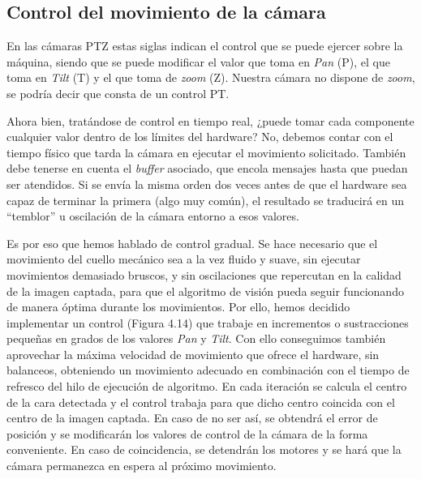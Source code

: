 \subsection{Control del movimiento de la cámara}
En las cámaras PTZ estas siglas indican el control que se puede ejercer sobre la máquina, siendo que se puede modificar el valor que toma en \textit{Pan} (P), el que toma en \textit{Tilt} (T) y el que toma de \textit{zoom} (Z). Nuestra cámara no dispone de \textit{zoom}, se podría decir que consta de un control PT.

Ahora bien, tratándose de control en tiempo real, ¿puede tomar cada componente cualquier valor dentro de los límites del hardware? No, debemos contar con el tiempo físico que tarda la cámara en ejecutar el movimiento solicitado. También debe tenerse en cuenta el \textit{buffer} asociado, que encola mensajes hasta que puedan ser atendidos. Si se envía la misma orden dos veces antes de que el hardware sea capaz de terminar la primera (algo muy común), el resultado se traducirá en un “temblor” u oscilación de la cámara entorno a esos valores.

Es por eso que hemos hablado de control gradual. Se hace necesario que el movimiento del cuello mecánico sea a la vez fluido y suave, sin ejecutar movimientos demasiado bruscos, y sin oscilaciones que repercutan en la calidad de la imagen captada, para que el algoritmo de visión pueda seguir funcionando de manera óptima durante los movimientos.
Por ello, hemos decidido implementar un control (Figura 4.14) que trabaje en incrementos o sustracciones pequeñas en grados de los valores \textit{Pan} y \textit{Tilt}. Con ello conseguimos también aprovechar la máxima velocidad de movimiento que ofrece el hardware, sin balanceos, obteniendo un movimiento adecuado en combinación con el tiempo de refresco del hilo de ejecución de algoritmo. En cada iteración se calcula el centro de la cara detectada y el control trabaja para que dicho centro coincida con el centro de la imagen captada. En caso de no ser así, se obtendrá el error de posición y se modificarán los valores de control de la cámara de la forma conveniente. En caso de coincidencia, se detendrán los motores y se hará que la cámara permanezca en espera al próximo movimiento.

